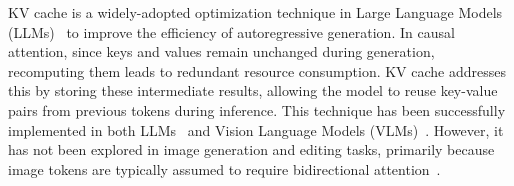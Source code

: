 KV cache is a widely-adopted optimization technique in Large Language Models  (LLMs)~\cite{brown2020language,xiao2023efficient,bai2023qwen,liu2024deepseek} to improve the efficiency of autoregressive generation. In causal attention, since keys and values remain unchanged during generation, recomputing them leads to redundant resource consumption. KV cache addresses this by storing these intermediate results, allowing the model to reuse key-value pairs from previous tokens during inference. This technique has been successfully implemented in both LLMs~\cite{brown2020language,xiao2023efficient,bai2023qwen,liu2024deepseek} and Vision Language Models (VLMs)~\cite{li2023blip,achiam2023gpt,liu2024visual,zhang2024flash,ye2024voco,huang2024learn,ye2024atp}. However, it has not been explored in image generation and editing tasks, primarily because image tokens are typically assumed to require bidirectional attention~\cite{dosovitskiy2020image,he2022masked}.
